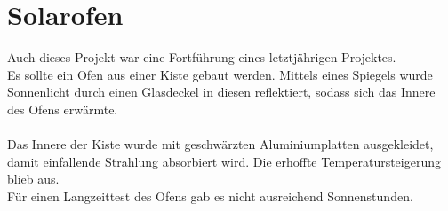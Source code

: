 \documentclass[
  bibliography=totoc,     %
  captions=tableheading,  %
  titlepage=firstiscover, %
  twocolumn,
]{scrartcl}
\begin{document}
\section{Solarofen}
Auch dieses Projekt war eine Fortführung eines letztjährigen Projektes.\\
Es sollte ein Ofen aus einer Kiste gebaut werden.
Mittels eines Spiegels wurde Sonnenlicht durch einen Glasdeckel in diesen reflektiert, sodass sich das Innere des Ofens erwärmte.\\
\\
Das Innere der Kiste wurde mit geschwärzten Aluminiumplatten ausgekleidet, damit einfallende Strahlung absorbiert wird.
Die erhoffte Temperatursteigerung blieb aus.\\
Für einen Langzeittest des Ofens gab es nicht ausreichend Sonnenstunden.
\end{document}
